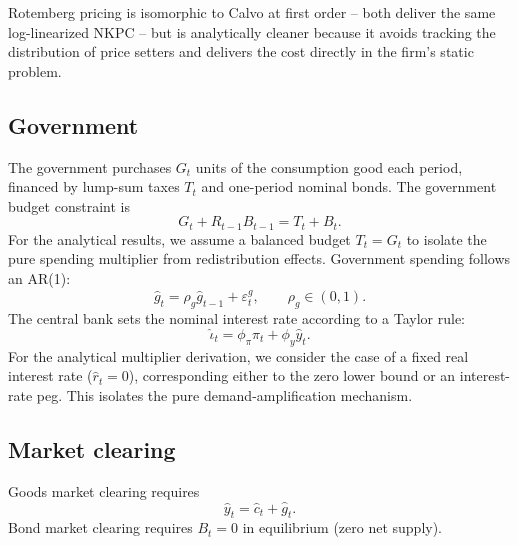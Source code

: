 \begin{remark}
Rotemberg pricing is isomorphic to Calvo at first order -- both deliver the same
log-linearized NKPC -- but is analytically cleaner because it avoids tracking
the distribution of price setters and delivers the cost directly in the firm's
static problem.
\end{remark}

\subsection{Government}\label{subsec:government}
The government purchases $G_{t}$ units of the consumption good each period,
financed by lump-sum taxes $T_{t}$ and one-period nominal bonds. The government
budget constraint is
\begin{equation}\label{eq:govt-bc}
  G_{t}+R_{t-1}B_{t-1}=T_{t}+B_{t}.
\end{equation}
For the analytical results, we assume a balanced budget $T_{t}=G_{t}$ to isolate
the pure spending multiplier from redistribution effects. Government spending
follows an AR(1):
\begin{equation}\label{eq:g-ar1}
  \hat g_{t}=\rho_{g}\hat g_{t-1}+\varepsilon^{g}_{t},\qquad \rho_{g}\in(0,1).
\end{equation}
The central bank sets the nominal interest rate according to a Taylor rule:
\begin{equation}\label{eq:taylor}
  \hat\iota_{t}=\phi_{\pi}\pi_{t}+\phi_{y}\hat y_{t}.
\end{equation}
For the analytical multiplier derivation, we consider the case of a fixed real
interest rate ($\hat r_{t}=0$), corresponding either to the zero lower bound or
an interest-rate peg. This isolates the pure demand-amplification mechanism.

\subsection{Market clearing}\label{subsec:mc}
Goods market clearing requires
\begin{equation}\label{eq:mc-goods}
  \hat y_{t}=\hat c_{t}+\hat g_{t}.
\end{equation}
Bond market clearing requires $B_{t}=0$ in equilibrium (zero net supply).
